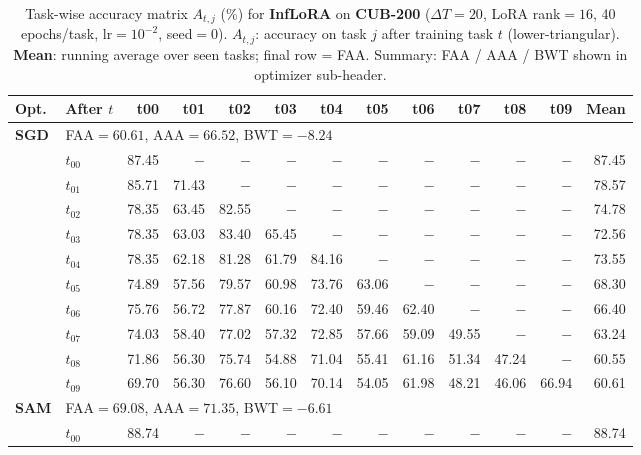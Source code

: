 \begin{table}[ht]
\centering
\caption{%
  Task-wise accuracy matrix $A_{t,j}$ (\%) for \textbf{InfLoRA} on \textbf{CUB-200}
  ($\Delta T=20$, LoRA rank$=16$, 40 epochs/task, lr$=10^{-2}$, seed$=0$).
  $A_{t,j}$: accuracy on task $j$ after training task $t$ (lower-triangular).
  \textbf{Mean}: running average over seen tasks; final row = FAA.
  Summary: FAA / AAA / BWT shown in optimizer sub-header.
}
\label{tab:raw_inflora_cub200}
\setlength{\tabcolsep}{2.8pt}
\renewcommand{\arraystretch}{0.88}
\scriptsize
\begin{tabular}{@{}l l r r r r r r r r r r r@{}}
\toprule
\textbf{Opt.} & \textbf{After $t$} & \textbf{t00} & \textbf{t01} & \textbf{t02} & \textbf{t03} & \textbf{t04} & \textbf{t05} & \textbf{t06} & \textbf{t07} & \textbf{t08} & \textbf{t09} & \textbf{Mean} \\
\midrule
\multirow{11}{*}{\textbf{SGD}} & \multicolumn{12}{l}{\quad\small FAA$=60.61$,\; AAA$=66.52$,\; BWT$=-8.24$} \\
 & $t_{00}$ & 87.45 & $-$ & $-$ & $-$ & $-$ & $-$ & $-$ & $-$ & $-$ & $-$ & 87.45 \\
 & $t_{01}$ & 85.71 & 71.43 & $-$ & $-$ & $-$ & $-$ & $-$ & $-$ & $-$ & $-$ & 78.57 \\
 & $t_{02}$ & 78.35 & 63.45 & 82.55 & $-$ & $-$ & $-$ & $-$ & $-$ & $-$ & $-$ & 74.78 \\
 & $t_{03}$ & 78.35 & 63.03 & 83.40 & 65.45 & $-$ & $-$ & $-$ & $-$ & $-$ & $-$ & 72.56 \\
 & $t_{04}$ & 78.35 & 62.18 & 81.28 & 61.79 & 84.16 & $-$ & $-$ & $-$ & $-$ & $-$ & 73.55 \\
 & $t_{05}$ & 74.89 & 57.56 & 79.57 & 60.98 & 73.76 & 63.06 & $-$ & $-$ & $-$ & $-$ & 68.30 \\
 & $t_{06}$ & 75.76 & 56.72 & 77.87 & 60.16 & 72.40 & 59.46 & 62.40 & $-$ & $-$ & $-$ & 66.40 \\
 & $t_{07}$ & 74.03 & 58.40 & 77.02 & 57.32 & 72.85 & 57.66 & 59.09 & 49.55 & $-$ & $-$ & 63.24 \\
 & $t_{08}$ & 71.86 & 56.30 & 75.74 & 54.88 & 71.04 & 55.41 & 61.16 & 51.34 & 47.24 & $-$ & 60.55 \\
 & $t_{09}$ & 69.70 & 56.30 & 76.60 & 56.10 & 70.14 & 54.05 & 61.98 & 48.21 & 46.06 & 66.94 & 60.61 \\
\midrule
\multirow{11}{*}{\textbf{SAM}} & \multicolumn{12}{l}{\quad\small FAA$=69.08$,\; AAA$=71.35$,\; BWT$=-6.61$} \\
 & $t_{00}$ & 88.74 & $-$ & $-$ & $-$ & $-$ & $-$ & $-$ & $-$ & $-$ & $-$ & 88.74 \\

\end{tabular}
\end{table}
